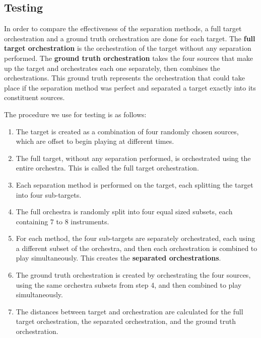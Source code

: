 \documentclass{article}
\begin{document}
		\subsection{Testing}\label{subsec:testing}
		In order to compare the effectiveness of the separation methods, a full target orchestration and a ground truth orchestration are done for each target. The \textbf{full target orchestration} is the orchestration of the target without any separation performed. The \textbf{ground truth orchestration} takes the four sources that make up the target and orchestrates each one separately, then combines the orchestrations. This ground truth represents the orchestration that could take place if the separation method was perfect and separated a target exactly into its constituent sources. 
		
		The procedure we use for testing is as follows:
		\begin{enumerate}
			\item The target is created as a combination of four randomly chosen sources, which are offset to begin playing at different times.
			\item The full target, without any separation performed, is orchestrated using the entire orchestra. This is called the full target orchestration.
			\item Each separation method is performed on the target, each splitting the target into four sub-targets. 
			\item The full orchestra is randomly split into four equal sized subsets, each containing 7 to 8 instruments.
			\item For each method, the four sub-targets are separately orchestrated, each using a different subset of the orchestra, and then each orchestration is combined to play simultaneously. This creates the \textbf{separated orchestrations}.
			\item The ground truth orchestration is created by orchestrating the four sources, using the same orchestra subsets from step 4, and then combined to play simultaneously.
			\item The distances between target and orchestration are calculated for the full target orchestration, the separated orchestration, and the ground truth orchestration. 
		\end{enumerate}	
\end{document}
